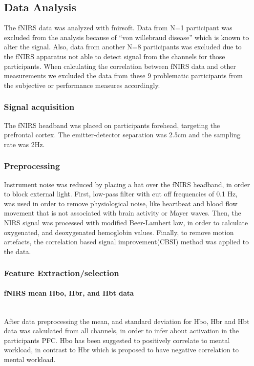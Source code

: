 \documentclass[a4paper]{report}
\begin{document}
		\subsection{Data Analysis}
		The fNIRS data was analyzed with fnirsoft\cite{ayazfunctional}. Data from N=1 participant was excluded from the analysis because of ``von willebraud disease'' which is known to alter the signal. Also, data from another N=8 participants was excluded due to the fNIRS apparatus not able to detect signal from the channels for those participants. When calculating the correlation between fNIRS data and other measurements we excluded the data from these 9 problematic participants from the subjective or performance measures accordingly.
			\subsubsection{Signal acquisition}
			The fNIRS headband was placed on participants forehead, targeting the prefrontal cortex. The emitter-detector separation was 2.5cm and the sampling rate was 2Hz.
			\subsubsection{Preprocessing}
			Instrument noise was reduced by placing a hat over the fNIRS headband, in order to block external light.
			First, low-pass filter with cut off frequencies of 0.1 Hz, was used in order to remove physiological noise, like heartbeat and blood flow movement that is not associated with brain activity or Mayer waves.
			Then, the NIRS signal was processed with modified Beer-Lambert law\cite{cope1988system}, in order to calculate oxygenated, and deoxygenated hemoglobin values.
			Finally, to remove motion artefacts, the correlation based signal improvement(CBSI)\cite{cui2010functional} method was applied to the data.
			\subsubsection{Feature Extraction/selection}
				\paragraph{fNIRS mean Hbo, Hbr, and Hbt data}\leavevmode\\
				After data preprocessing the mean, and standard deviation for Hbo, Hbr and Hbt data was calculated from all channels, in order to infer about activation in the participants PFC. Hbo has been suggested to positively correlate to mental workload, in contrast to Hbr which is proposed to have negative correlation to mental workload.
\end{document}
